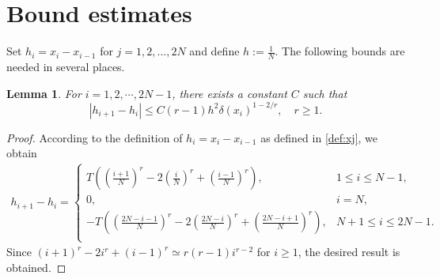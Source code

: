 \documentclass{amsart}
\newtheorem{lemma}[theorem]{Lemma}
\theoremstyle{definition}
\theoremstyle{remark}
\numberwithin{equation}{section}
\begin{document}
\section{Bound estimates}
Set
\(
  h_i = x_{i} - x_{i-1}
\) for $j = 1, 2, ... ,  2N$ 
and define $h := \frac{1}{N}$. 
The following bounds are needed in several places.
\begin{lemma} \label{lmm:hi1-hi}
For \(i=1,2,\cdots,2N-1\), there exists a constant \(C\) such that 
\begin{equation*}
  |h_{i+1} - h_{i}| \le C(r-1) h^2 \delta(x_i)^{1-2/r} , \quad r\ge 1.
\end{equation*}
\end{lemma}
\begin{proof}
According to the definition of $h_i=x_i-x_{i-1}$ as defined in \eqref{def:xj}, we obtain
\begin{equation*}
  \begin{aligned}
    h_{i+1} - h_{i} =
    \begin{cases}
      T \left( \left(\frac{i+1}{N}\right)^r - 2\left(\frac{i}{N}\right)^r + \left(\frac{i-1}{N}\right)^r  \right) ,           & 1\le i\le N-1,    \\
      0,    & i=N,    \\
      -T \left( \left(\frac{2N-i-1}{N}\right)^r - 2\left(\frac{2N-i}{N}\right)^r + \left(\frac{2N-i+1}{N}\right)^r  \right) , & N+1\le i\le 2N-1 .    \\
    \end{cases}
  \end{aligned}
\end{equation*}
Since $(i+1)^r - 2i^r + (i-1)^r \simeq r(r-1)i^{r-2}$ for $i\ge 1$,
the desired result is obtained.
\end{proof}
\end{document}
